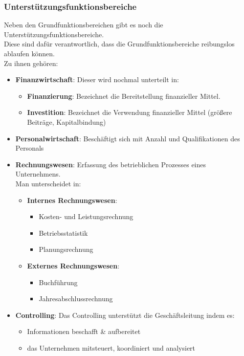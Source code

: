 \documentclass[10pt]{article}
\begin{document}
\subsubsection{Unterstützungsfunktionsbereiche}
Neben den Grundfunktionsbereichen gibt es noch die Unterstützungsfunktionsbereiche. \\
Diese sind dafür verantwortlich, dass die Grundfunktionsbereiche reibungslos ablaufen können. \\
Zu ihnen gehören:
\begin{itemize}
\item \textbf{Finanzwirtschaft}: Dieser wird nochmal unterteilt in:
\begin{itemize}
\item \textbf{Finanzierung}: Bezeichnet die Bereitstellung finanzieller  Mittel.  
\item \textbf{Investition}: Bezeichnet die Verwendung finanzieller Mittel (größere  Beiträge, Kapitalbindung)
\end{itemize}
\item \textbf{Personalwirtschaft}: Beschäftigt sich mit Anzahl und Qualifikationen des Personals
\item \textbf{Rechnungswesen}: Erfassung des  betrieblichen Prozesses eines Unternehmens. \\
Man unterscheidet in:
\begin{itemize}
\item \textbf{Internes Rechnungswesen}:
\begin{itemize}
\item Kosten- und Leistungsrechnung
\item Betriebsstatistik 
\item Planungsrechnung
\end{itemize}
\item \textbf{Externes Rechnungswesen}:
\begin{itemize}
\item Buchführung
\item Jahresabschlussrechnung
\end{itemize}
\end{itemize}
\item \textbf{Controlling}: Das Controlling unterstützt die Geschäftsleitung indem es:
\begin{itemize}
\item Informationen beschafft \& aufbereitet
\item das Unternehmen mitsteuert, koordiniert und analysiert
\end{itemize} 
\end{itemize}
\end{document}
